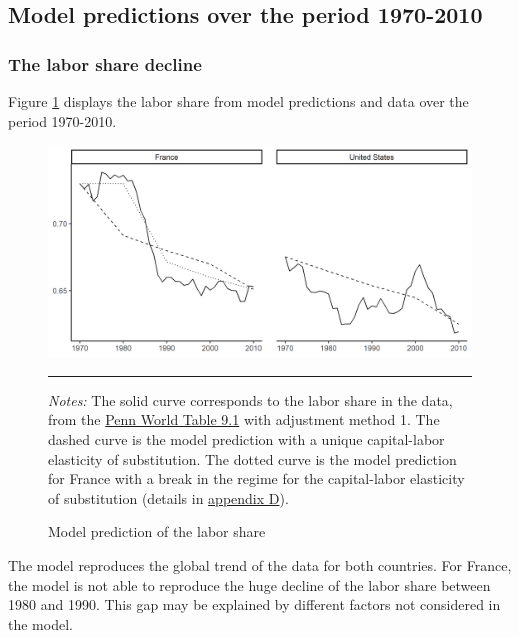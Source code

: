 \subsection{Model predictions over the period 1970-2010}\label{subsec:model_pred}

\subsubsection{The labor share decline}

Figure \ref{fig:baseline7010} displays the labor share from model predictions and data over the period 1970-2010.
\begin{figure}[tb]
	\centering
	\includegraphics[width=1\linewidth]{../result/baseline7010.png}
	\caption{Model prediction of the labor share}
	\label{fig:baseline7010}
	\vspace{.5ex}
	\hrule
	\vspace{-4ex}
	\justify\singlespacing\footnotesize \textit{Notes:} The solid curve corresponds to the labor share in the data, from the \href{https://www.rug.nl/ggdc/productivity/pwt/}{Penn World Table 9.1} with adjustment method 1. The dashed curve is the model prediction with a unique capital-labor elasticity of substitution. The dotted curve is the model prediction for France with a break in the regime for the capital-labor elasticity of substitution (details in \hyperref[appendix:regime]{appendix D}).
\end{figure}
The model reproduces the global trend of the data for both countries. For France, the model is not able to reproduce the huge decline of the labor share between 1980 and 1990. This gap may be explained by different factors not considered in the model.
